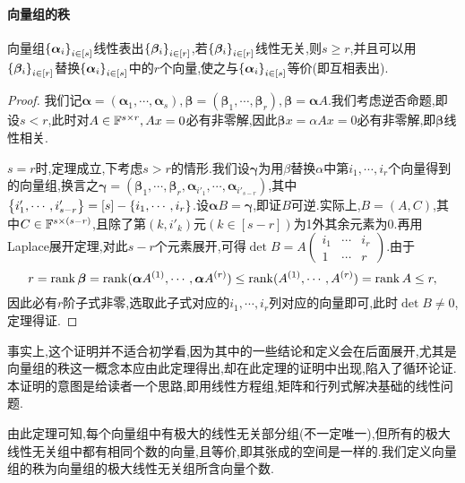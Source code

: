 \documentclass[openany]{book}
\begin{document}
\paragraph{向量组的秩}
\begin{theorem}[Steinitz替换定理]
    向量组$\left\{\bm{\alpha}_i\right\}_{i\in [s]}$线性表出$\left\{\bm{\beta}_i\right\}_{i\in [r]}$,若$\left\{\bm{\beta}_i\right\}_{i\in [r]}$线性无关,则$s\geq r$,并且可以用$\left\{\bm{\beta}_i\right\}_{i\in [r]}$替换$\left\{\bm{\alpha}_i\right\}_{i\in [s]}$中的$r$个向量,使之与$\left\{\bm{\alpha}_i\right\}_{i\in [s]}$等价(即互相表出).
\end{theorem}
\begin{proof}
    我们记$\bm{\alpha}=(\bm{\alpha}_1,\cdots,\bm{\alpha}_s),\bm{\beta}=(\bm{\beta}_1,\cdots,\bm{\beta}_r),\bm{\beta}=\bm{\alpha}A$.我们考虑逆否命题,即设$s<r$,此时对$A\in \mathbb{F}^{s\times r}, Ax=0$必有非零解,因此$\bm{\beta}x=\alpha Ax=0$必有非零解,即$\bm{\beta}$线性相关.

    $s=r$时,定理成立,下考虑$s>r$的情形.我们设$\bm{\gamma}$为用$\beta$替换$\alpha$中第$i_1,\cdots,i_r$个向量得到的向量组,换言之$\bm{\gamma}=(\bm{\beta}_1,\cdots,\bm{\beta}_r,\bm{\alpha}_{i'_1},\cdots,\bm{\alpha}_{i'_{s-r}})$,其中$\left\{i'_1,\cdots,i'_{s-r}\right\}=[s]-\left\{i_1,\cdots,i_r\right\}$.设$\bm{\alpha}B=\bm{\gamma}$,即证$B$可逆.实际上,$B=(A,C)$,其中$C\in\mathbb{F}^{s\times (s-r)}$,且除了第$(k,i'_k)$元$(k\in [s-r])$为1外其余元素为0.再用Laplace展开定理,对此$s-r$个元素展开,可得$\det B=A\begin{pmatrix}
        i_1&\cdots&i_r\\1&\cdots&r
    \end{pmatrix}$.由于
    $$r=\operatorname{rank} \bm{\beta}=\operatorname{rank}(\bm{\alpha}A^{(1)},\cdots,\bm{\alpha}A^{(r)})\leq \operatorname{rank}(A^{(1)},\cdots,A^{(r)})=\operatorname{rank} A\leq r,$$
    因此必有$r$阶子式非零,选取此子式对应的$i_1,\cdots,i_r$列对应的向量即可,此时$\det B\neq 0$,定理得证.
\end{proof}
事实上,这个证明并不适合初学看,因为其中的一些结论和定义会在后面展开,尤其是向量组的秩这一概念本应由此定理得出,却在此定理的证明中出现,陷入了循环论证.本证明的意图是给读者一个思路,即用线性方程组,矩阵和行列式解决基础的线性问题.

由此定理可知,每个向量组中有极大的线性无关部分组(不一定唯一),但所有的极大线性无关组中都有相同个数的向量,且等价,即其张成的空间是一样的.我们定义向量组的秩为向量组的极大线性无关组所含向量个数.
\end{document}

